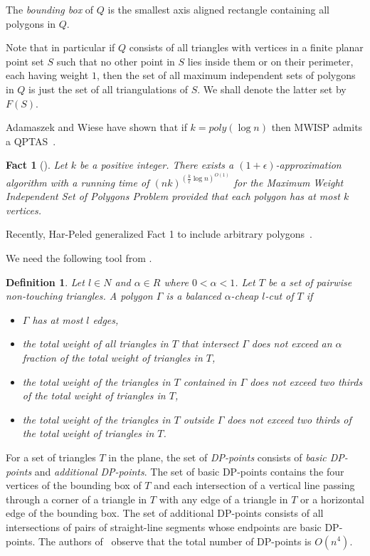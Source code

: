 \documentclass[a4paper]{article}
\newtheorem{definition}{Definition}
\newtheorem{fact}{Fact}
\begin{document}
The \emph{bounding box} of $Q$ is the smallest
axis aligned rectangle containing all polygons
in $Q$.

Note that in particular if 
${Q}$ consists of all triangles with vertices
in a finite planar point set $S$ such that
no other point in $S$ lies inside them or
on their perimeter, each having weight $1$,
then the set of all maximum independent
sets of polygons in ${Q}$ is just the set
of all triangulations of $S$. We shall denote
the latter set by $F(S)$. 


Adamaszek and Wiese have shown that if $k=poly(\log n)$
then MWISP admits a QPTAS~\cite{AW14}.
\begin{fact}[\cite{AW14}] Let $k$ be a positive integer.
There exists a $(1+\epsilon)$-approximation
algorithm with a running time of $(nk)^{({\frac k{\epsilon}}\log
    n)^{O(1)}}$
for the Maximum Weight Independent Set of Polygons Problem provided
that each polygon has at most $k$ vertices.
\end{fact}
Recently, Har-Peled generalized Fact 1 to include arbitrary
polygons~\cite{H14}.

We need the following tool from  \cite{AW14}.

\begin{definition}
Let $l\in N$ and $\alpha \in R$ where $0<\alpha<1$.
Let $T$ be a set of pairwise non-touching triangles.
A polygon $\Gamma$  is a balanced $\alpha$-cheap
$l$-cut of $T$ if
\begin{itemize}
\item $\Gamma$ has at most $l$ edges,
\item the total weight of all triangles
in $T$ that intersect $\Gamma$
does not exceed an $\alpha$ fraction
of the total weight of triangles in $T$,
\item 
the total weight of the triangles in $T$
contained in $\Gamma$ does not
exceed two thirds of the total weight
of triangles in $T$,
\item 
the total weight of the triangles in $T$
outside $\Gamma$ does not
exceed  two thirds of the total weight
of triangles in $T$.
\end{itemize}
\end{definition}

For a set of triangles $T$ in the plane,
the set of \emph{DP-points} consists
of \emph{basic DP-points} and \emph{additional DP-points}.
The set of basic DP-points contains
the four vertices of the bounding box
of $T$ and each intersection of
a vertical line passing through a corner
of a triangle in $T$ with any edge
of a triangle in $T$ or a horizontal
edge of the bounding box.
The set of additional DP-points 
consists of all intersections of
pairs of straight-line segments whose
endpoints are basic DP-points.
The authors of~\cite{AW14} observe that
the total number of DP-points is $O(n^4)$.
\end{document}
